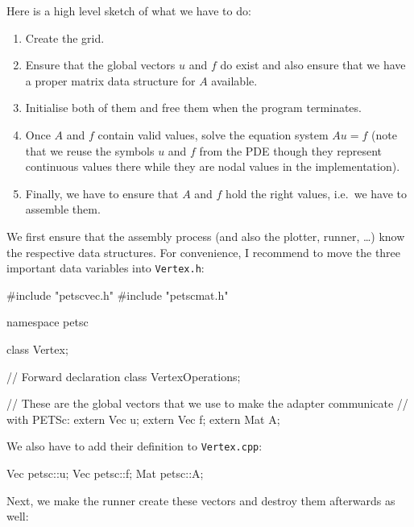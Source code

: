 Here is a high level sketch of what we have to do:
\begin{enumerate}
  \item Create the grid.
  \item Ensure that the global vectors $u$ and $f$ do exist and also ensure that
  we have a proper matrix data structure for $A$ available.
  \item Initialise both of them and free them when the program terminates.
  \item Once $A$ and $f$ contain valid values, solve the equation system $Au=f$
  (note that we reuse the symbols $u$ and $f$ from the PDE though they
  represent continuous values there while they are nodal values in the
  implementation).
  \item Finally, we have to ensure that $A$ and $f$ hold the right values,
  i.e.~we have to assemble them.
\end{enumerate}

\noindent
We first ensure that the assembly process (and also the plotter, runner, \ldots)
know the respective data structures.
For convenience, I recommend to move the three important data variables
into \texttt{Vertex.h}:

\begin{code}
#include "petscvec.h"
#include "petscmat.h"


namespace petsc { 
  class Vertex;
      
  // Forward declaration
  class VertexOperations;

  // These are the global vectors that we use to make the adapter communicate
  // with PETSc:
  extern Vec  u;
  extern Vec  f;
  extern Mat  A;
}
\end{code}

\noindent
We also have to add their definition
to \texttt{Vertex.cpp}:

\begin{code}
Vec  petsc::u;
Vec  petsc::f;
Mat  petsc::A;
\end{code}


\noindent
Next, we make the runner create these vectors and destroy them
afterwards as well:

